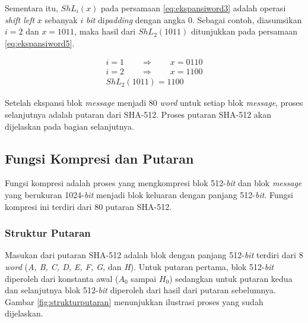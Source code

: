 Sementara itu, \begin{math}ShL_i(x)\end{math} pada persamaan \ref{eq:ekspansiword3} adalah operasi \textit{shift left} \begin{math}x\end{math} sebanyak \begin{math}i\end{math} \textit{bit} di\textit{padding} dengan angka 0. Sebagai contoh, diasumsikan \begin{math}i=2\end{math} dan \begin{math}x=1011\end{math}, maka hasil dari \begin{math}ShL_2(1011)\end{math} ditunjukkan pada persamaan \ref{eq:ekspansiword5}.

\begin{align}
	i = 1 \qquad\Rightarrow\qquad x = 0110 \nonumber \\
	i = 2 \qquad\Rightarrow\qquad x = 1100 \label{eq:ekspansiword5} \\
	ShL_2(1011) = 1100 \nonumber
\end{align}

Setelah ekspansi blok \textit{message} menjadi 80 \textit{word} untuk setiap blok \textit{message}, proses selanjutnya adalah putaran dari SHA-512. Proses putaran SHA-512 akan dijelaskan pada bagian selanjutnya.

\subsection{Fungsi Kompresi dan Putaran}\label{subsec:putaransha}

Fungsi kompresi adalah proses yang mengkompresi blok 512-\textit{bit} dan blok \textit{message} yang berukuran 1024-\textit{bit} menjadi blok keluaran dengan panjang 512-\textit{bit}. Fungsi kompresi ini terdiri dari 80 putaran SHA-512. 

\subsubsection{Struktur Putaran}

Masukan dari putaran SHA-512 adalah blok dengan panjang 512-\textit{bit} terdiri dari 8 \textit{word} (\textit{A, B, C, D, E, F, G,} dan \textit{H}). Untuk putaran pertama, blok 512-\textit{bit} diperoleh dari konstanta awal (\begin{math}A_0\end{math} sampai \begin{math}H_0\end{math}) sedangkan untuk putaran kedua dan selanjutnya blok 512-\textit{bit} diperoleh dari hasil dari putaran sebelumnya. Gambar \ref{fig:strukturputaran} menunjukkan ilustrasi proses yang sudah dijelaskan.

